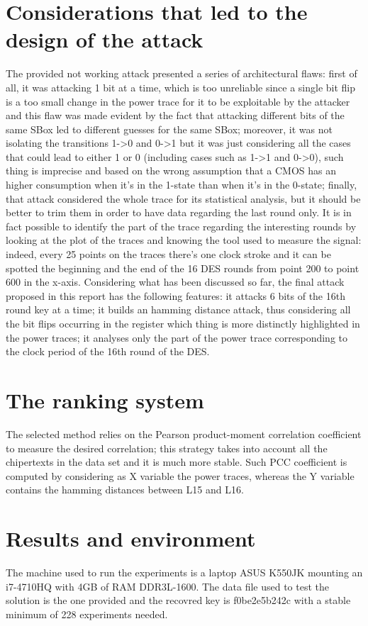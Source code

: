 \documentclass[11pt]{article} %
\begin{document}
\section{Considerations that led to the design of the attack}
The provided not working attack presented a series of architectural flaws: first of all, it was attacking 1 bit at a time, which is too unreliable since a single bit flip is a too small change in the power trace for it to be exploitable by the attacker and this flaw was made evident by the fact that attacking different bits of the same SBox led to different guesses for the same SBox; moreover, it was not isolating the transitions 1->0 and 0->1 but it was just considering all the cases that could lead to either 1 or 0 (including cases such as 1->1 and 0->0), such thing is imprecise and based on the wrong assumption that a CMOS has an higher consumption when it's in the 1-state than when it's in the 0-state; finally, that attack considered the whole trace for its statistical analysis, but it should be better to trim them in order to have data regarding the last round only. It is in fact possible to identify the part of the trace regarding the interesting rounds by looking at the plot of the traces and knowing the tool used to measure the signal: indeed, every 25 points on the traces there's one clock stroke and it can be spotted the beginning and the end of the 16 DES rounds from point 200 to point 600 in the x-axis. 
Considering what has been discussed so far, the final attack proposed in this report has the following features: it attacks 6 bits of the 16th round key at a time; it builds an hamming distance attack, thus considering all the bit flips occurring in the register which thing is more distinctly highlighted in the power traces; it analyses only the part of the power trace corresponding to the clock period of the 16th round of the DES.

\section{The ranking system}
The selected method relies on the Pearson product-moment correlation coefficient to measure the desired correlation; this strategy takes into account all the chipertexts in the data set and it is much more stable. Such PCC coefficient is computed by considering as X variable the power traces, whereas the Y variable contains the hamming distances between L15 and L16.

\section{Results and environment}
The machine used to run the experiments is a laptop ASUS K550JK mounting an i7-4710HQ with 4GB of RAM DDR3L-1600. The data file used to test the solution is the one provided and the recovred key is f0be2e5b242c with a stable minimum of 228 experiments needed.
\end{document}
